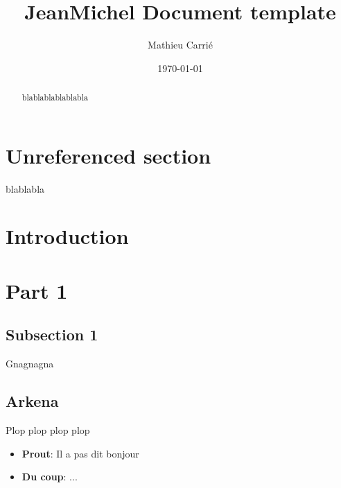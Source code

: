 \documentclass[]{jeanmicheldoc}
\title{JeanMichel Document template}
\author{Mathieu Carrié}
\date{\today}
\begin{document}
\maketitle

\newpage

\vspace{5cm}
\begin{abstract}
    blablablablablabla
\end{abstract}

\newpage

\section*{Unreferenced section}

blablabla

\newpage

\pagestyle{fancy}

{
    \hypersetup{linkcolor=blue!30!black}
    \tableofcontents
}

\newpage

\section{Introduction}
\section{Part 1}
    \subsection{Subsection 1}
    Gnagnagna
    \subsection{Arkena}
    Plop plop plop plop
\begin{itemize}
	\item \textbf{Prout}: Il a pas dit bonjour
    \item \textbf{Du coup}: ...
\end{itemize}
\end{document}
